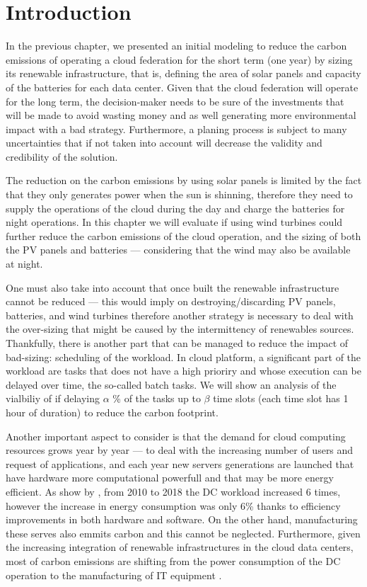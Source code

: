 \section{Introduction}

In the previous chapter, we presented an initial modeling to reduce the carbon emissions of operating a cloud federation for the short term (one year) by sizing its renewable infrastructure, that is, defining the area of solar panels and capacity of the batteries for each data center.  Given that the cloud federation will operate for the long term, the decision-maker needs to be sure of the investments that will be made to avoid wasting money and as well generating more environmental impact with a bad strategy. Furthermore, a planing process is subject to many uncertainties that if not taken into account will decrease the validity and credibility of the solution.

The reduction on the carbon emissions by using solar panels is limited by the fact that they only generates power when the sun is shinning, therefore they need to supply the operations of the cloud during the day and charge the batteries for night operations. In this chapter we will evaluate if using wind turbines could further reduce the carbon emissions of the cloud operation, and the sizing of both the PV panels and batteries --- considering that the wind may also be available at night.

One must also take into account that once built the renewable infrastructure cannot be reduced --- this would imply on destroying/discarding PV panels, batteries, and wind turbines therefore another strategy is necessary to deal with the over-sizing that might be caused by the intermittency of renewables sources. Thankfully, there is another part that can be managed to reduce the impact of bad-sizing: scheduling of the workload. In cloud platform, a significant part of the workload are tasks that does not have a high prioriry and whose execution can be delayed over time, the so-called batch tasks. We will show an analysis of the vialbiliy of if delaying $\alpha$ \% of the tasks up  to $\beta$ time slots (each time slot has 1 hour of duration) to reduce the carbon footprint.

Another important aspect to consider is that the demand for cloud computing resources grows year by year --- to deal with the increasing number of users and request of applications, and each year new servers generations are launched that have hardware more computational powerfull and that may be more energy efficient. As show by \citet{masanet2020recalibrating}, from 2010 to 2018 the DC workload increased 6 times, however the increase in energy consumption was only 6\% thanks to efficiency improvements in both hardware and software.  On the other hand, manufacturing these serves also emmits carbon and this cannot be neglected. Furthermore, given the increasing integration of renewable infrastructures in the cloud data centers, most of carbon emissions are shifting from the power consumption of the DC operation to the manufacturing of IT equipment \cite{gupta2021_chasingcarbon}.

